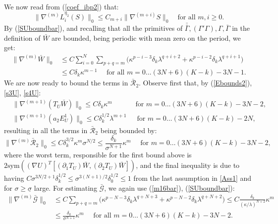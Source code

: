 \documentclass[reqno,twoside,11pt]{amsart}
\newcommand{\sym}{\mathrm{sym}}
\newcommand*{\dbar}[1]{\bar{\bar{#1}}}
\numberwithin{equation}{section}
\theoremstyle{plain}
\theoremstyle{definition}
\begin{document}
We now read from (\ref{coef_ibp2}) that:
\begin{equation}\label{m16bar}
\|\nabla^{(m)}L_i^{\eta_2}(S)\|_0\leq
C_{m+i}\|\nabla^{(m+i)}S\|_0\quad\mbox{for all } m,i\geq 0.
\end{equation}
By (\ref{SUboundbar}), and recalling that all the primitives of $\dbar\Gamma,
(\Gamma'\Gamma), \Gamma, \bar\Gamma$ in the definition of $\bar W$ are
bounded, being periodic with mean zero on the period, we get:
\begin{equation}\label{m14bar}
\begin{split}
\|\nabla^{(m)}\bar W\|_0&\leq C\sum_{i=0}^N\sum_{p+q=m}\Big(\kappa^{p-i-3}\delta_k\lambda^{q+i+2}
+ \kappa^{p-i-2}\delta_k\lambda^{q+i+1}\Big) \\ & \leq C
\delta_k\kappa^{m-1} \quad\mbox{ for all } m=0\ldots (3N+6)(K-k)-3N-1.
\end{split}
\end{equation}
We are now ready to bound the terms in $\bar{\mathcal{R}}_2$. Observe first
that, by (\ref{Ebounds2}), \ref{s3U}, \ref{s4U}:
\begin{equation*}
\begin{split}
& \|\nabla^{(m+1)}(T_{U}\bar W)\|_0\leq C\delta_k\kappa^m
\quad\qquad \mbox{ for } m=0\ldots (3N+6)(K-k)-3N-2,\\
& \|\nabla^{(m+1)}(a_2E^1_{U})\|_0\leq C\delta_k^{1/2}\lambda^{m+1}
\,\quad \mbox{ for } m=0\ldots (3N+6)(K-k)-2N,
\end{split}
\end{equation*}
resulting in all the terms in $\bar{\mathcal{R}}_2$ being bounded by:
\begin{equation}\label{m15bar}
\|\nabla^{(m)}\bar{\mathcal{R}}_2\|_0\leq C\delta_k^{3/2}\kappa^m \sigma^{N/2}\leq
\frac{\delta_k}{\sigma^{N+1}}\kappa^m\quad \mbox{ for } m=0\ldots (3N+6)(K-k)-3N-2,
\end{equation}
where the worst term, responsible for the first bound above is
$2\sym((\nabla U)^T[(\partial_1T_{U})\bar W, (\partial_2T_{U})\bar W])$,
and the final inequality is due to having 
$C\sigma^{3N/2+1}\delta_k^{1/2}\leq \sigma^{3(N+1)/2}\delta_0^{1/2} \leq 1$ 
from the last assumption in \ref{Ass1} and for
$\sigma\geq\underline\sigma$ large. For estimating $\bar{\mathcal{G}}$,
we again use (\ref{m16bar}), (\ref{SUboundbar}):
\begin{equation}\label{m17bar}
\begin{split}
\|\nabla^{(m)}\bar{\mathcal{G}}\|_0& \leq C\sum_{p+q=m}\Big(\kappa^{p-N-3}\delta_k\lambda^{q+N+3}
+ \kappa^{p-N-2}\delta_k\lambda^{q+N+2}\Big) \leq C
\frac{\delta_k}{(\kappa/\lambda)^{N+2}}\kappa^m 
\\ & \leq \frac{\delta_k}{\sigma^{N+1}}\kappa^m
\quad \mbox{ for all } m=0\ldots (3N+6)(K-k)-3N-2.
\end{split}
\end{equation}
\end{document}
